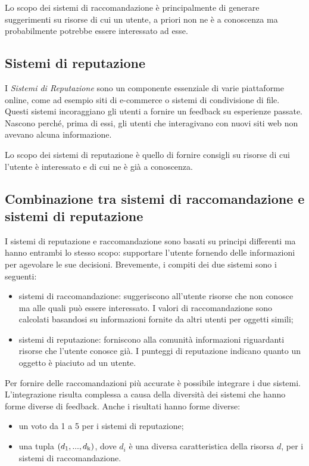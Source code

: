 \documentclass[letterpaper]{article} %
\begin{document}
Lo scopo dei sistemi di raccomandazione è principalmente di generare
suggerimenti su risorse di cui un utente, a priori non ne è a conoscenza
ma probabilmente potrebbe essere interessato ad esse.

\subsection{Sistemi di reputazione}

I \emph{Sistemi di Reputazione} sono un componente essenziale di varie
piattaforme online, come ad esempio siti di e-commerce o sistemi di
condivisione di file. Questi sistemi incoraggiano gli utenti a fornire
un feedback su esperienze passate. Nascono perché, prima di essi, gli
utenti che interagivano con nuovi siti web non avevano alcuna
informazione.

Lo scopo dei sistemi di reputazione è quello di fornire consigli su
risorse di cui l'utente è interessato e di cui ne è già a conoscenza.

\subsection{Combinazione tra sistemi di raccomandazione e sistemi di reputazione}

I sistemi di reputazione e raccomandazione
sono basati su principi differenti ma hanno entrambi lo stesso scopo:
supportare l'utente fornendo delle informazioni per agevolare le sue
decisioni. Brevemente, i compiti dei due sistemi sono i seguenti:

\begin{itemize}
\item
sistemi di raccomandazione: suggeriscono all'utente risorse che non
conosce ma alle quali può essere interessato. I valori di
raccomandazione sono calcolati basandosi su informazioni fornite da
altri utenti per oggetti simili;
\item
sistemi di reputazione: forniscono alla comunità informazioni
riguardanti risorse che l'utente conosce già. I punteggi di
reputazione indicano quanto un oggetto è piaciuto ad un utente.
\end{itemize}

Per fornire delle raccomandazioni più accurate è possibile integrare i
due sistemi. L'integrazione risulta complessa a causa della diversità
dei sistemi che hanno forme diverse di feedback. Anche i risultati hanno
forme diverse:

\begin{itemize}
\item
un voto da 1 a 5 per i sistemi di reputazione;
\item
una tupla $(d\textsubscript{1}, ... , d\textsubscript{k})$, dove $d_i$ è una diversa caratteristica della
risorsa $d$, per i sistemi di raccomandazione.
\end{itemize}
\end{document}
